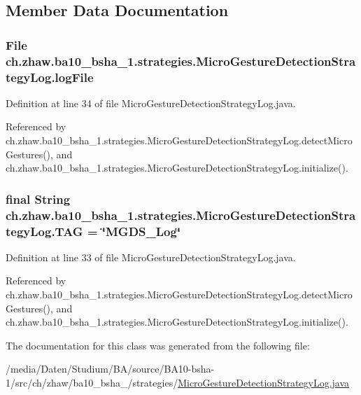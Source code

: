 \subsection{Member Data Documentation}
\hypertarget{classch_1_1zhaw_1_1ba10__bsha__1_1_1strategies_1_1MicroGestureDetectionStrategyLog_a864950c0660460ae511b1b0e8e44bf62}{
\subsubsection[{logFile}]{\setlength{\rightskip}{0pt plus 5cm}File {\bf ch.zhaw.ba10\_\-bsha\_\-1.strategies.MicroGestureDetectionStrategyLog.logFile}}}
\label{classch_1_1zhaw_1_1ba10__bsha__1_1_1strategies_1_1MicroGestureDetectionStrategyLog_a864950c0660460ae511b1b0e8e44bf62}


Definition at line 34 of file MicroGestureDetectionStrategyLog.java.

Referenced by ch.zhaw.ba10\_\-bsha\_\-1.strategies.MicroGestureDetectionStrategyLog.detectMicroGestures(), and ch.zhaw.ba10\_\-bsha\_\-1.strategies.MicroGestureDetectionStrategyLog.initialize().\hypertarget{classch_1_1zhaw_1_1ba10__bsha__1_1_1strategies_1_1MicroGestureDetectionStrategyLog_aca8a670df7feba2931ca2ecc6e2f7802}{
\subsubsection[{TAG}]{\setlength{\rightskip}{0pt plus 5cm}final String {\bf ch.zhaw.ba10\_\-bsha\_\-1.strategies.MicroGestureDetectionStrategyLog.TAG} = \char`\"{}MGDS\_\-Log\char`\"{}}}
\label{classch_1_1zhaw_1_1ba10__bsha__1_1_1strategies_1_1MicroGestureDetectionStrategyLog_aca8a670df7feba2931ca2ecc6e2f7802}


Definition at line 33 of file MicroGestureDetectionStrategyLog.java.

Referenced by ch.zhaw.ba10\_\-bsha\_\-1.strategies.MicroGestureDetectionStrategyLog.detectMicroGestures(), and ch.zhaw.ba10\_\-bsha\_\-1.strategies.MicroGestureDetectionStrategyLog.initialize().

The documentation for this class was generated from the following file:\begin{DoxyCompactItemize}
\item 
/media/Daten/Studium/BA/source/BA10-\/bsha-\/1/src/ch/zhaw/ba10\_\-bsha\_/strategies/\hyperlink{MicroGestureDetectionStrategyLog_8java}{MicroGestureDetectionStrategyLog.java}\end{DoxyCompactItemize}
